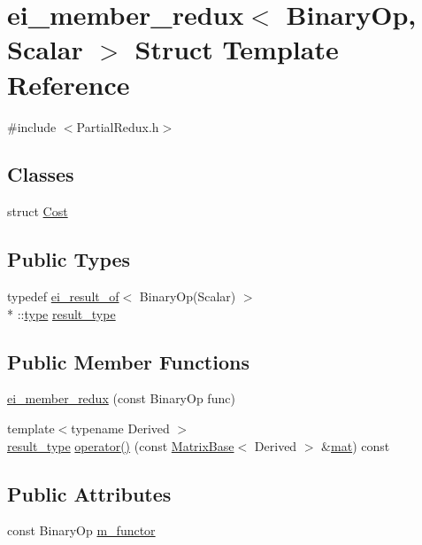 \hypertarget{structei__member__redux}{\section{ei\-\_\-member\-\_\-redux$<$ Binary\-Op, Scalar $>$ Struct Template Reference}
\label{structei__member__redux}
}


{\ttfamily \#include $<$Partial\-Redux.\-h$>$}

\subsection*{Classes}
\begin{DoxyCompactItemize}
\item 
struct \hyperlink{structei__member__redux_1_1_cost}{Cost}
\end{DoxyCompactItemize}
\subsection*{Public Types}
\begin{DoxyCompactItemize}
\item 
typedef \hyperlink{structei__result__of}{ei\-\_\-result\-\_\-of}$<$ Binary\-Op(Scalar) $>$\\*
\-::\hyperlink{glext_8h_a7d05960f4f1c1b11f3177dc963a45d86}{type} \hyperlink{structei__member__redux_a25dda253f1a58c5ee16f2d5b8e5d51cf}{result\-\_\-type}
\end{DoxyCompactItemize}
\subsection*{Public Member Functions}
\begin{DoxyCompactItemize}
\item 
\hyperlink{structei__member__redux_a1c2e1ed9f06eb3f7d01219627b522537}{ei\-\_\-member\-\_\-redux} (const Binary\-Op func)
\item 
{\footnotesize template$<$typename Derived $>$ }\\\hyperlink{structei__member__redux_a25dda253f1a58c5ee16f2d5b8e5d51cf}{result\-\_\-type} \hyperlink{structei__member__redux_a03ef170c683212c2ec327dd84fcee48c}{operator()} (const \hyperlink{class_matrix_base}{Matrix\-Base}$<$ Derived $>$ \&\hyperlink{uavobjecttemplate_8m_a16a51e808b16c46bbfd36da2e37cd123}{mat}) const 
\end{DoxyCompactItemize}
\subsection*{Public Attributes}
\begin{DoxyCompactItemize}
\item 
const Binary\-Op \hyperlink{structei__member__redux_a90d74301482bf6fa75fd2f77bf6c63d5}{m\-\_\-functor}
\end{DoxyCompactItemize}



